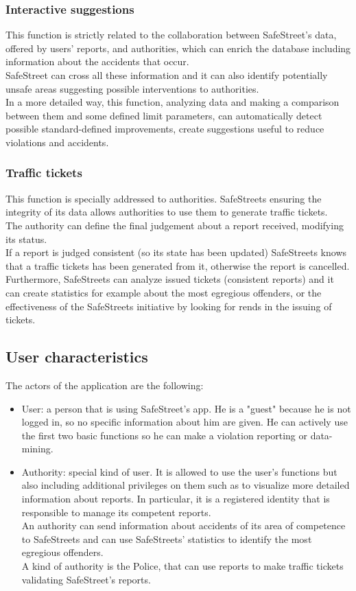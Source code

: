 \documentclass{article}
\begin{document}
		\subsubsection{Interactive suggestions}
			This function is strictly related to the collaboration between SafeStreet's data, offered by users' reports, and authorities, which can enrich the database including information about the accidents that occur. \\SafeStreet can cross all these information and it can also identify potentially unsafe areas suggesting possible interventions to authorities. \\
			In a more detailed way, this function, analyzing data and making a comparison between them and some defined limit parameters, can automatically detect possible standard-defined improvements, create suggestions useful to reduce violations and accidents.
		
		\subsubsection{Traffic tickets}
			This function is specially addressed to authorities. SafeStreets ensuring the integrity of its data allows authorities to use them to generate traffic tickets. \\
			The authority can define the final judgement about a report received, modifying its status.\\
			If a report is judged consistent (so its state has been updated) SafeStreets knows that a traffic tickets has been generated from it, otherwise the report is cancelled.\\
			Furthermore, SafeStreets can analyze issued tickets (consistent reports) and it can create statistics for example about the most egregious offenders, or the effectiveness of the SafeStreets initiative by looking for rends in the issuing of tickets.
		
		
		\subsection{User characteristics}
			The actors of the application are the following:
			\begin{itemize}
				\item User: a person that is using SafeStreet's app. He is a "guest" because he is not logged in, so no specific information about him are given. He can actively use the first two basic functions so he can make a violation reporting or data-mining.
				\item Authority: special kind of user. It is allowed to use the user's functions but also including additional privileges on them such as to visualize more detailed information about reports. In particular, it is a registered identity that is responsible to manage its competent reports. \\An authority can send information about accidents of its area of competence to SafeStreets and can use SafeStreets' statistics to identify the most egregious offenders.\\
		        A kind of authority is the Police, that can use reports to make traffic tickets validating SafeStreet's reports.
			\end{itemize}
		
\end{document}
